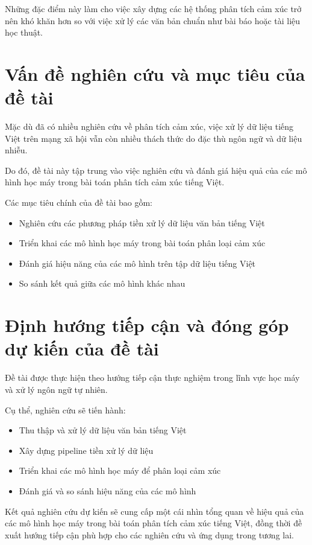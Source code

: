 \documentclass[14pt, a4paper]{report}
\begin{document}
Những đặc điểm này làm cho việc xây dựng các hệ thống phân tích cảm xúc trở nên khó khăn hơn so với việc xử lý các văn bản chuẩn như bài báo hoặc tài liệu học thuật.

\section{Vấn đề nghiên cứu và mục tiêu của đề tài}

Mặc dù đã có nhiều nghiên cứu về phân tích cảm xúc, việc xử lý dữ liệu tiếng Việt trên mạng xã hội vẫn còn nhiều thách thức do đặc thù ngôn ngữ và dữ liệu nhiễu.

Do đó, đề tài này tập trung vào việc nghiên cứu và đánh giá hiệu quả của các mô hình học máy trong bài toán phân tích cảm xúc tiếng Việt.

Các mục tiêu chính của đề tài bao gồm:

\begin{itemize}
    \item Nghiên cứu các phương pháp tiền xử lý dữ liệu văn bản tiếng Việt
    \item Triển khai các mô hình học máy trong bài toán phân loại cảm xúc
    \item Đánh giá hiệu năng của các mô hình trên tập dữ liệu tiếng Việt
    \item So sánh kết quả giữa các mô hình khác nhau
\end{itemize}

\section{Định hướng tiếp cận và đóng góp dự kiến của đề tài}

Đề tài được thực hiện theo hướng tiếp cận thực nghiệm trong lĩnh vực học máy và xử lý ngôn ngữ tự nhiên.

Cụ thể, nghiên cứu sẽ tiến hành:

\begin{itemize}
    \item Thu thập và xử lý dữ liệu văn bản tiếng Việt
    \item Xây dựng pipeline tiền xử lý dữ liệu
    \item Triển khai các mô hình học máy để phân loại cảm xúc
    \item Đánh giá và so sánh hiệu năng của các mô hình
\end{itemize}

Kết quả nghiên cứu dự kiến sẽ cung cấp một cái nhìn tổng quan về hiệu quả của các mô hình học máy trong bài toán phân tích cảm xúc tiếng Việt, đồng thời đề xuất hướng tiếp cận phù hợp cho các nghiên cứu và ứng dụng trong tương lai.
\end{document}
